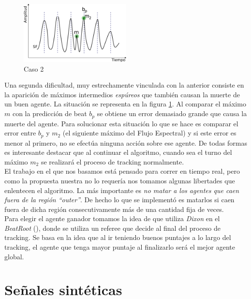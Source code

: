\documentclass[12pt,a4paper,titlepage]{report}
\begin{document}
\begin{figure}
	\vspace{-25pt}
	\begin{center}
	\includegraphics[width=0.5\textwidth]{./pics/caso2.png}
	\end{center}
	\vspace{-20pt}
	\caption{Caso 2}
	\label{fig:caso2}
\end{figure}

Una segunda dificultad, muy estrechamente vinculada con la anterior consiste en la aparición de máximos intermedios \emph{espúreos} que también causan la muerte de un buen agente. La situación se representa en la figura \ref{fig:caso2}. Al comparar el máximo $m$ con la predicción de beat $b_p$ se obtiene un error demasiado grande que causa la muerte del agente. Para solucionar esta situación lo que se hace es comparar el error entre $b_p$ y $m_2$ (el siguiente máximo del Flujo Espectral) y si este error es menor al primero, no se efectúa ninguna acción sobre ese agente. De todas formas es interesante destacar que al continuar el algoritmo, cuando sea el turno del máximo $m_2$ se realizará el proceso de tracking normalmente.\\

El trabajo en el que nos basamos está pensado para correr en tiempo real, pero como la propuesta nuestra no lo requería nos tomamos algunas libertades que enlentecen el algoritmo. La más importante es \emph{no matar a los agentes que caen fuera de la región ``outer''}. De hecho lo que se implementó es matarlos si caen fuera de dicha región consecutivamente más de una cantidad fija de veces.\\

Para elegir el agente ganador tomamos la idea de que utiliza \emph{Dixon} en el \emph{BeatRoot} (\cite{bib:dixon}), donde se utiliza un referee que decide al final del proceso de tracking. Se basa en la idea que al ir teniendo buenos puntajes a lo largo del tracking, el agente que tenga mayor puntaje al finalizarlo será el mejor agente global.

\section{Señales sintéticas}
\end{document}
